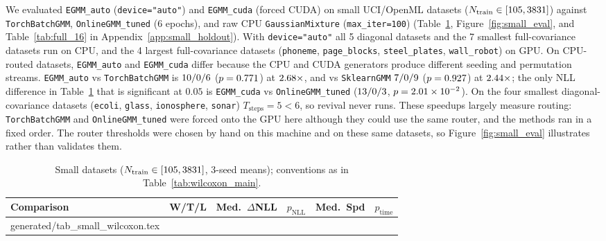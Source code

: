 \documentclass[10pt]{article} %
\makeatletter
\newcommand{\gentable}[1]{\@@input generated/#1.tex }
\makeatother
\begin{document}
We evaluated \texttt{EGMM\_auto} (\texttt{device="auto"}) and \texttt{EGMM\_cuda} (forced CUDA) on \rnSmall{} small UCI/OpenML datasets ($N_{\mathrm{train}} \in [105, 3831]$) against \texttt{TorchBatchGMM}, \texttt{OnlineGMM\_tuned} (6 epochs), and raw CPU \texttt{GaussianMixture} (\texttt{max\_iter=100}) (Table~\ref{tab:wilcoxon_small}, Figure~\ref{fig:small_eval}, and Table~\ref{tab:full_16} in Appendix~\ref{app:small_holdout}). With \texttt{device="auto"} all 5 diagonal datasets and the 7 smallest full-covariance datasets run on CPU, and the 4 largest full-covariance datasets (\texttt{phoneme}, \texttt{page\_blocks}, \texttt{steel\_plates}, \texttt{wall\_robot}) on GPU. On CPU-routed datasets, \texttt{EGMM\_auto} and \texttt{EGMM\_cuda} differ because the CPU and CUDA generators produce different seeding and permutation streams. \texttt{EGMM\_auto} vs \texttt{TorchBatchGMM} is $10/0/6$ ($p = 0.771$) at $2.68\times$, and vs \texttt{SklearnGMM} $7/0/9$ ($p = 0.927$) at $2.44\times$; the only NLL difference in Table~\ref{tab:wilcoxon_small} that is significant at $0.05$ is \texttt{EGMM\_cuda} vs \texttt{OnlineGMM\_tuned} ($13/0/3$, $p = 2.01\times 10^{-2}$). On the four smallest diagonal-covariance datasets (\texttt{ecoli}, \texttt{glass}, \texttt{ionosphere}, \texttt{sonar}) $T_{\mathrm{steps}} = 5 < 6$, so revival never runs. These speedups largely measure routing: \texttt{TorchBatchGMM} and \texttt{OnlineGMM\_tuned} were forced onto the GPU here although they could use the same router, and the methods ran in a fixed order. The router thresholds were chosen by hand on this machine and on these same datasets, so Figure~\ref{fig:small_eval} illustrates rather than validates them.

\begin{table}[htbp]
\centering
\caption{Small datasets ($N_{\mathrm{train}} \in [105, 3831]$, 3-seed means); conventions as in Table~\ref{tab:wilcoxon_main}.}
\label{tab:wilcoxon_small}
\small
\setlength{\tabcolsep}{6.0pt}
\begin{tabular}{lccccc}
\toprule
\textbf{Comparison} & \textbf{W/T/L} & \textbf{Med.\ $\Delta$NLL} & \textbf{$p_{\mathrm{NLL}}$} & \textbf{Med.\ Spd} & \textbf{$p_{\mathrm{time}}$} \\
\midrule
\gentable{tab_small_wilcoxon}
\bottomrule
\end{tabular}
\end{table}
\end{document}
